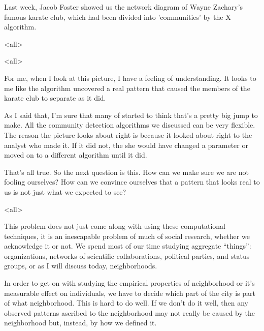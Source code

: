 Last week, Jacob Foster showed us the network diagram of Wayne
Zachary's famous karate club, which had been divided into
'communities' by the X algorithm. 


\mode<all>{
}



\testframe{}

\mode<all>{
\blackout{}
}  

For me, when I look at this picture, I have a feeling of
understanding. It looks to me like the algorithm uncovered a real
pattern that caused the members of the karate club to separate as it
did. 

As I said that, I'm sure that many of started to think that's a pretty
big jump to make. All the community detection algorithms we discussed
can be very flexible. The reason the picture looks about right is
because it looked about right to the analyst who made it. If it did
not, the she would have changed a parameter or moved on to a different
algorithm until it did.

That's all true. So the next question is this. How can we make sure we
are not fooling ourselves? How can we convince ourselves that a
pattern that looks real to us is not just what we expected to see?

\mode<all>{
}


This problem does not just come along with using these computational
techniques, it is an inescapable problem of much of social research,
whether we acknowledge it or not. We spend most of our time studying
aggregate ``things'': organizations, networks of scientific
collaborations, political parties, and status groups, or as I will
discuss today, neighborhoods.

In order to get on with studying the empirical properties of
neighborhood or it's measurable effect on individuals, we have to
decide which part of the city is part of what neighborhood. This is
hard to do well. If we don't do it well, then any observed patterns
ascribed to the neighborhood may not really be caused by the
neighborhood but, instead, by how we defined it.










